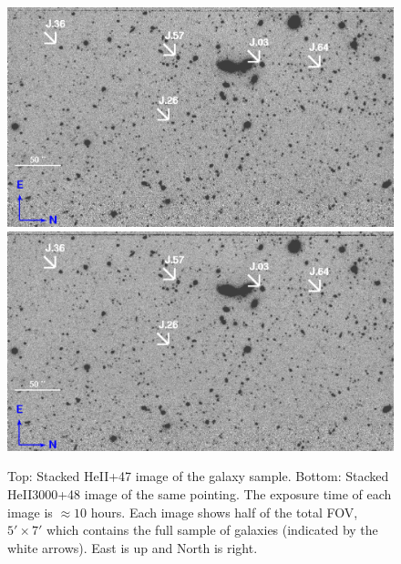 \documentclass[twocolumn]{aastex61}
\begin{document}
\begin{figure}[ht!]
\centering
\includegraphics[scale=.61]{../Figures/HEII_final.png}
\includegraphics[scale=.61]{../Figures/HEII3000_final.png}
\caption{Top: Stacked HeII+47 image of the galaxy sample. Bottom: Stacked HeII3000+48 image of the same pointing. The exposure time of each image is $\approx 10$ hours. Each image shows half of the total FOV, $5' \times 7'$ which contains the full sample of galaxies (indicated by the white arrows). East is up and North is right.
\label{fig:stacked_image}}
\end{figure}
\end{document}
